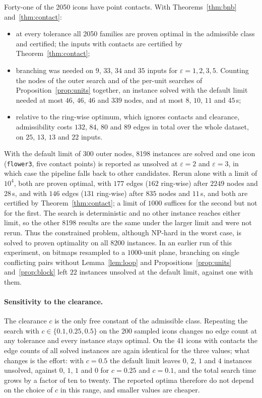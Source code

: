 \documentclass[11pt,a4paper]{article}
\theoremstyle{definition}
\theoremstyle{remark}
\begin{document}
Forty-one of the 2050 icons have point contacts. With
Theorems~\ref{thm:bnb} and~\ref{thm:contact}:
\begin{itemize}
\item at every tolerance all 2050 families are proven optimal in the
  admissible class and certified; the inputs with contacts are certified by
  Theorem~\ref{thm:contact};
\item branching was needed on $9$, $33$, $34$ and $35$ inputs for
  $\varepsilon=1,2,3,5$. Counting the nodes of the outer search and of the
  per-unit searches of Proposition~\ref{prop:units} together, an instance
  solved with the default limit needed at most $46$, $46$, $46$ and $339$
  nodes, and at most $8$, $10$, $11$ and $45$\,s;
\item relative to the ring-wise optimum, which ignores contacts and
  clearance, admissibility costs $132$, $84$, $80$ and $89$ edges in total
  over the whole dataset, on $25$, $13$, $13$ and $22$ inputs.
\end{itemize}
With the default limit of $300$ outer nodes, 8198 instances are solved and
one icon (\texttt{flower3}, five contact points) is reported as unsolved at
$\varepsilon=2$ and $\varepsilon=3$, in which case the pipeline falls back to
other candidates. Rerun alone with a limit of $10^{4}$, both are proven
optimal, with $177$ edges ($162$ ring-wise) after $2249$ nodes and $28$\,s,
and with $146$ edges ($131$ ring-wise) after $835$ nodes and $11$\,s, and both
are certified by Theorem~\ref{thm:contact}; a limit of $1000$ suffices for the
second but not for the first. The search is deterministic and no other
instance reaches either limit, so the other 8198 results are the same under
the larger limit and were not rerun. Thus the constrained problem, although
NP-hard in the worst case, is solved to proven optimality on all 8200
instances. In an earlier run of this experiment, on bitmaps resampled to a
$1000$-unit plane, branching on single conflicting pairs without
Lemma~\ref{lem:loop} and Propositions~\ref{prop:units} and~\ref{prop:block}
left $22$ instances unsolved at the default limit, against one with them.

\paragraph{Sensitivity to the clearance.} The clearance $c$ is the only free
constant of the admissible class. Repeating the search with
$c\in\{0.1,0.25,0.5\}$ on the 200 sampled icons changes no edge count at any
tolerance and every instance stays optimal. On the 41 icons with contacts the
edge counts of all solved instances are again identical for the three values;
what changes is the effort: with $c=0.5$ the default limit leaves $0$, $2$,
$1$ and $4$ instances unsolved, against $0$, $1$, $1$ and $0$ for $c=0.25$
and $c=0.1$, and the total search time grows by a factor of ten to twenty.
The reported optima therefore do not depend on the choice of $c$ in this
range, and smaller values are cheaper.
\end{document}

